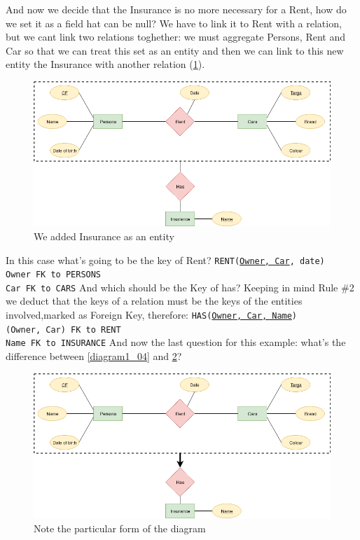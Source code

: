 \documentclass[class=book, crop=false, oneside]{standalone}
\begin{document}
And now we decide that the Insurance is no more necessary for a Rent, how do we set it as a field hat can be null?
We have to link it to Rent with a relation, but we cant link two relations toghether: we must aggregate Persons, Rent and Car so that we can treat this set as an entity and then we can link to this new entity the Insurance with another relation (\ref{diagram1_05}).
\begin{figure}[H]
	\includegraphics[width=\textwidth,keepaspectratio]{diagram1_05.png}
	\caption{We added Insurance as an entity}
	\label{diagram1_05}
\end{figure}
In this case what's going to be the key of Rent?
\vskip 10pt
\texttt{RENT(\underline{Owner, Car}, date)}\\
	\texttt{Owner FK to PERSONS}\\
	\texttt{Car FK to CARS}
\vskip 10pt
And which should be the Key of has?
Keeping in mind Rule \#2 we deduct that the keys of a relation must be the keys of the entities involved,marked as Foreign Key, therefore:
\vskip 10pt
\texttt{HAS(\underline{Owner, Car, Name})}\\
	\texttt{(Owner, Car) FK to RENT}\\
	\texttt{Name FK to INSURANCE}
\vskip 10pt
And now the last question for this example: what's the difference between \ref{diagram1_04} and \ref{diagram1_06}?
\begin{figure}[H]
	\includegraphics[width=\textwidth,keepaspectratio]{diagram1_06.png}
	\caption{Note the particular form of the diagram}
	\label{diagram1_06}
\end{figure}
\end{document}
